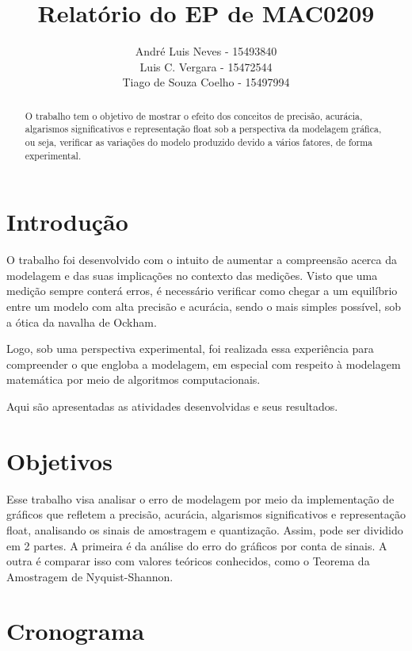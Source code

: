 \documentclass[12pt]{article}
\title{Relatório do EP de MAC0209}
\author{André Luis Neves - 15493840\\Luis C. Vergara - 15472544\\Tiago de Souza Coelho - 15497994}
\begin{document}
\maketitle


\begin{abstract}
O trabalho  tem o objetivo de mostrar o efeito dos conceitos de precisão, acurácia, algarismos significativos e representação float sob a perspectiva da modelagem gráfica, ou seja, verificar as variações do modelo produzido devido a vários fatores, de forma experimental. 

\end{abstract}

\newpage

\tableofcontents

\newpage

\section{Introdução}

O trabalho foi desenvolvido com o intuito de aumentar a compreensão acerca da modelagem e das suas implicações no contexto das medições. Visto que uma medição sempre conterá erros, é necessário verificar como chegar a um equilíbrio entre um modelo com alta precisão e acurácia, sendo o mais simples possível, sob a ótica da navalha de Ockham.

Logo, sob uma perspectiva experimental, foi realizada essa experiência para compreender o que engloba a modelagem, em especial com respeito à modelagem matemática por meio de algoritmos computacionais.

Aqui são apresentadas as atividades desenvolvidas e seus resultados.

\section{Objetivos}

Esse trabalho visa analisar o erro de modelagem por meio da implementação de gráficos que refletem a precisão, acurácia, algarismos significativos e representação float, analisando os sinais de amostragem e quantização. Assim, pode ser dividido em 2 partes. A primeira é da análise do erro do gráficos por conta de sinais. A outra é comparar isso com valores teóricos conhecidos, como o Teorema da Amostragem de Nyquist-Shannon.

\section{Cronograma}
\end{document}
